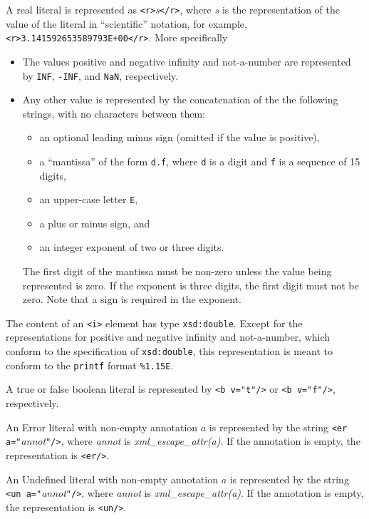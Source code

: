 \documentclass{article}
\begin{document}
A real literal is represented as \verb|<r>|\emph{s}\verb|</r>|, where
\emph{s} is the representation of the value of the literal in ``scientific''
notation, for example, \verb|<r>3.141592653589793E+00</r>|.
More specifically
\begin{itemize}
    \item The values positive and negative infinity and not-a-number are
    represented by
    \verb/INF/,
    \verb/-INF/,
    and
    \verb/NaN/,
    respectively.
    \item Any other value is represented by the concatenation of the
    the following strings, with no characters between them:
    \begin{itemize}
        \item an optional leading minus sign (omitted if the value is
            positive),
        \item a ``mantissa'' of the form \verb/d.f/, where
            \verb/d/ is a digit and \verb/f/ is a sequence of 15 digits,
        \item an upper-case letter \verb/E/,
        \item a plus or minus sign, and
        \item an integer exponent of two or three digits.
    \end{itemize}
    The first digit of the mantissa must be non-zero unless the value being
    represented is zero.  If the exponent is three digits, the first digit
    must not be zero.  Note that a sign is required in the exponent.
\end{itemize}
The content of an \verb/<i>/ element has type \verb/xsd:double/.
Except for the representations for positive and negative infinity and
not-a-number, which conform to the specification of \verb/xsd:double/,
this representation is meant to conform to the \texttt{printf} format
\verb/%1.15E/.

A true or false boolean literal is represented by \verb|<b v="t"/>|
or \verb|<b v="f"/>|, respectively.

An Error literal with non-empty annotation $a$ is represented by the string
\verb|<er a="|\emph{annot}\verb|"/>|, where \emph{annot} is
\emph{xml\_escape\_attr(a)}.  If the annotation is empty, the representation is
\verb|<er/>|.

An Undefined literal with non-empty annotation $a$ is represented by the string
\verb|<un a="|\emph{annot}\verb|"/>|, where \emph{annot} is
\emph{xml\_escape\_attr(a)}.  If the annotation is empty, the representation is
\verb|<un/>|.
\end{document}
